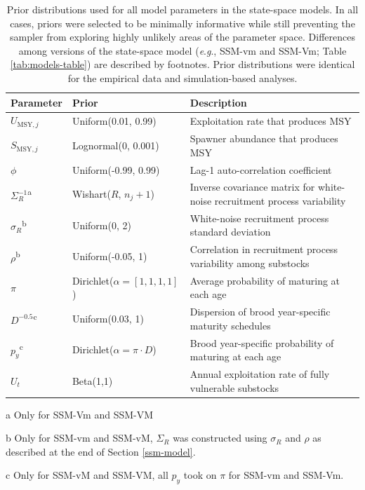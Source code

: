 \documentclass[12pt,]{book}
\theoremstyle{definition}
\theoremstyle{definition}
\theoremstyle{definition}
\theoremstyle{remark}
\begin{document}
\begin{table}

\caption{\label{tab:ssm-prior-table}Prior distributions used for all model parameters in the state-space models. In all cases, priors were selected to be minimally informative while still preventing the sampler from exploring highly unlikely areas of the parameter space. Differences among versions of the state-space model (\textit{e}.\textit{g}., SSM-vm and SSM-Vm; Table \ref{tab:models-table}) are described by footnotes. Prior distributions were identical for the empirical data and simulation-based analyses.}
\centering
\begin{threeparttable}
\begin{tabular}[t]{ll>{\raggedright\arraybackslash}p{20em}}
\toprule
\textbf{Parameter} & \textbf{Prior} & \textbf{Description}\\
\midrule
$U_{\text{MSY},j}$ & Uniform(0.01, 0.99) & Exploitation rate that produces MSY\\
$S_{\text{MSY},j}$ & Lognormal(0, 0.001) & Spawner abundance that produces MSY\\
$\phi$ & Uniform(-0.99, 0.99) & Lag-1 auto-correlation coefficient\\
$\Sigma^{-1}_R$\textsuperscript{a} & Wishart($R$, $n_j+1$) & Inverse covariance matrix for white-noise recruitment process variability\\
$\sigma_R$\textsuperscript{b} & Uniform(0, 2) & White-noise recruitment process standard deviation\\
$\rho$\textsuperscript{b} & Uniform(-0.05, 1) & Correlation in recruitment process variability among substocks\\
$\pi$ & Dirichlet($\alpha = [1,1,1,1]$) & Average probability of maturing at each age\\
$D^{-0.5}$\textsuperscript{c} & Uniform(0.03, 1) & Dispersion of brood year-specific maturity schedules\\
$p_y$\textsuperscript{c} & Dirichlet($\alpha = \pi \cdot D$) & Brood year-specific probability of maturing at each age\\
$U_t$ & Beta(1,1) & Annual exploitation rate of fully vulnerable substocks\\
\bottomrule
\end{tabular}
\begin{tablenotes}
\item[a] Only for SSM-Vm and SSM-VM
\item[b] Only for SSM-vm and SSM-vM, $\Sigma_R$ was constructed using $\sigma_R$ and $\rho$ as described at the end of Section \ref{ssm-model}.
\item[c] Only for SSM-vM and SSM-VM, all $p_y$ took on $\pi$ for SSM-vm and SSM-Vm.
\end{tablenotes}
\end{threeparttable}
\end{table}
\end{document}

